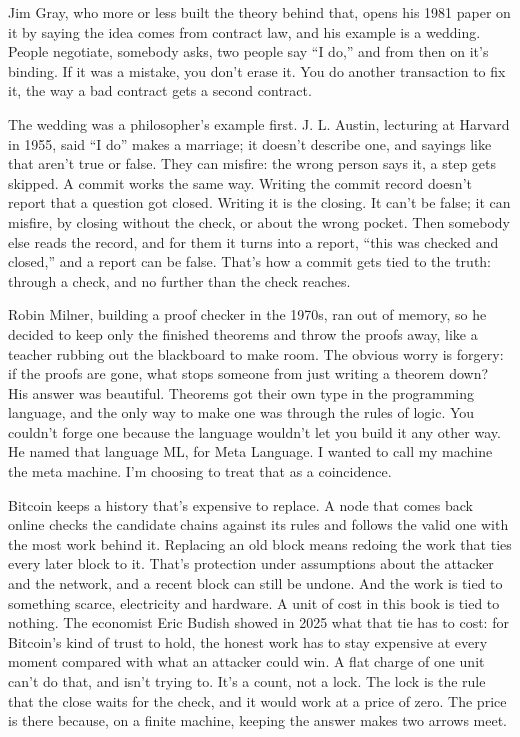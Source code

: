\documentclass[11pt,twoside]{article}
\theoremstyle{thielethm}
\theoremstyle{thieledef}
\theoremstyle{thieledef}
\theoremstyle{thieledef}
\theoremstyle{thielethm}
\theoremstyle{thieleobs}
\theoremstyle{thielethm}
\begin{document}
Jim Gray, who more or less built the theory behind that, opens his 1981 paper on it by saying the idea comes from contract law, and his example is a wedding. People negotiate, somebody asks, two people say ``I do,'' and from then on it's binding. If it was a mistake, you don't erase it. You do another transaction to fix it, the way a bad contract gets a second contract.

The wedding was a philosopher's example first. J. L. Austin, lecturing at Harvard in 1955, said ``I do'' makes a marriage; it doesn't describe one, and sayings like that aren't true or false. They can misfire: the wrong person says it, a step gets skipped. A commit works the same way. Writing the commit record doesn't report that a question got closed. Writing it is the closing. It can't be false; it can misfire, by closing without the check, or about the wrong pocket. Then somebody else reads the record, and for them it turns into a report, ``this was checked and closed,'' and a report can be false. That's how a commit gets tied to the truth: through a check, and no further than the check reaches.

Robin Milner, building a proof checker in the 1970s, ran out of memory, so he decided to keep only the finished theorems and throw the proofs away, like a teacher rubbing out the blackboard to make room. The obvious worry is forgery: if the proofs are gone, what stops someone from just writing a theorem down? His answer was beautiful. Theorems got their own type in the programming language, and the only way to make one was through the rules of logic. You couldn't forge one because the language wouldn't let you build it any other way. He named that language ML, for Meta Language. I wanted to call my machine the meta machine. I'm choosing to treat that as a coincidence.

Bitcoin keeps a history that's expensive to replace. A node that comes back online checks the candidate chains against its rules and follows the valid one with the most work behind it. Replacing an old block means redoing the work that ties every later block to it. That's protection under assumptions about the attacker and the network, and a recent block can still be undone. And the work is tied to something scarce, electricity and hardware. A unit of cost in this book is tied to nothing. The economist Eric Budish showed in 2025 what that tie has to cost: for Bitcoin's kind of trust to hold, the honest work has to stay expensive at every moment compared with what an attacker could win. A flat charge of one unit can't do that, and isn't trying to. It's a count, not a lock. The lock is the rule that the close waits for the check, and it would work at a price of zero. The price is there because, on a finite machine, keeping the answer makes two arrows meet.
\end{document}
